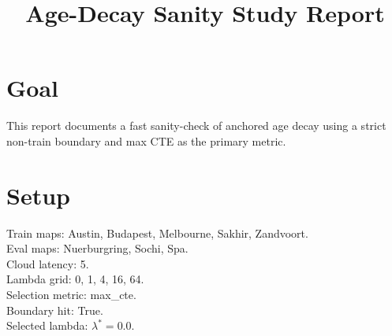 \documentclass[conference]{IEEEtran}
\begin{document}
\title{Age-Decay Sanity Study Report}
\maketitle

\section{Goal}
This report documents a fast sanity-check of anchored age decay using a strict non-train boundary and max CTE as the primary metric.

\section{Setup}
Train maps: Austin, Budapest, Melbourne, Sakhir, Zandvoort.\\
Eval maps: Nuerburgring, Sochi, Spa.\\
Cloud latency: 5.\\
Lambda grid: 0, 1, 4, 16, 64.\\
Selection metric: max\_cte.\\
Boundary hit: True.\\
Selected lambda: $\lambda^* = 0.0$.
\end{document}
